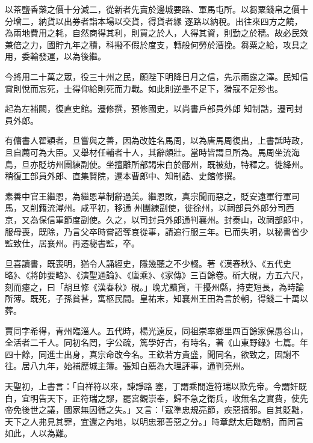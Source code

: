 \begin{pinyinscope}
 以茶鹽香藥之價十分減二，從新者先賣於邊城要路、軍馬屯所。以芻粟錢帛之價十分增二，納貨以出券者詣本場以交貨，得貨者緣
 逐路以納稅。出往來四方之饒，為兩地費用之耗，自然商得其利，則買之於人，人得其資，則勤之於穡。故必民效兼倍之力，國貯九年之積，科撥不假於度支，轉般何勞於漕挽。芻粟之給，攻具之用，委輸發運，以為後繼。



 今將用二十萬之眾，役三十州之民，願陛下明降日月之信，先示雨露之澤。民知信賞則悅而忘死，士得仰給則死而力戰。如此則逆壘不足下，猾寇不足殄也。



 起為左補闕，復直史館。遷修撰，預修國史，以尚書戶部員外郎
 知制誥，遷司封員外郎。



 有傭書人翟穎者，旦嘗與之善，因為改姓名馬周，以為唐馬周復出，上書詆時政，且自薦可為大臣。又舉材任輔者十人，其辭頗壯。當時皆謂旦所為。馬周坐流海島，旦亦貶坊州團練副使。坐擅離所部謁宋白於鄜州，既被劾，特釋之。徙絳州。稍復工部員外郎、直集賢院，遷本曹郎中、知制誥、史館修撰。



 素善中官王繼恩，為繼恩草制辭過美。繼恩敗，真宗聞而惡之，貶安遠軍行軍司馬，又削籍流潯州。咸平初，移通
 州團練副使，徙徐州，以祠部員外郎分司西京，又為保信軍節度副使。久之，以司封員外郎通判襄州。封泰山，改祠部郎中，服母喪，既除，乃言父卒時嘗詔奪哀從事，請追行服三年。已而失明，以秘書省少監致仕，居襄州。再遷秘書監，卒。



 旦喜讀書，既喪明，猶令人誦經史，隱幾聽之不少輟。著《漢春秋》、《五代史略》、《將帥要略》、《演聖通論》、《唐乘》、《家傳》三百餘卷。斫大硯，方五六尺，刻而瘞之，曰「胡旦修《漢春秋》硯。」晚尤黷貨，干擾州縣，持吏短長，為時論
 所薄。既死，子孫貧甚，寓柩民間。皇祐末，知襄州王田為言於朝，得錢二十萬以葬。



 賈同字希得，青州臨淄人。五代時，楊光遠反，同祖崇率鄉里四百餘家保愚谷山，全活者二千人。同初名罔，字公疏，篤學好古，有時名，著《山東野錄》七篇。年四十餘，同進士出身，真宗命改今名。王欽若方貴盛，聞同名，欲致之，固謝不往。居八九年，始補歷城主簿。張知白薦為大理評事，通判兗州。



 天聖初，上書言：「自祥符以來，諫諍路
 塞，丁謂乘間造符瑞以欺先帝。今謂奸既白，宜明告天下，正符瑞之謬，罷宮觀崇奉，歸不急之衛兵，收無名之實費，使先帝免後世之議，國家無因循之失。」又言：「寇準忠規亮節，疾惡擯邪。自其貶黜，天下之人弗見其罪，宜還之內地，以明忠邪善惡之分。」時章獻太后臨朝，而同言如此，人以為難。




\end{pinyinscope}
